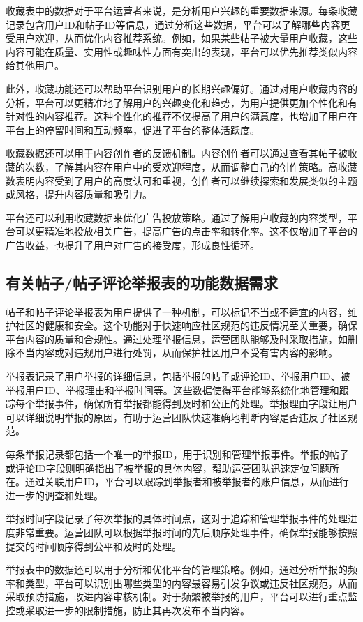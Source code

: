 收藏表中的数据对于平台运营者来说，是分析用户兴趣的重要数据来源。每条收藏记录包含用户ID和帖子ID等信息，通过分析这些数据，平台可以了解哪些内容更受用户欢迎，从而优化内容推荐系统。例如，如果某些帖子被大量用户收藏，这些内容可能在质量、实用性或趣味性方面有突出的表现，平台可以优先推荐类似内容给其他用户。

此外，收藏功能还可以帮助平台识别用户的长期兴趣偏好。通过对用户收藏内容的分析，平台可以更精准地了解用户的兴趣变化和趋势，为用户提供更加个性化和有针对性的内容推荐。这种个性化的推荐不仅提高了用户的满意度，也增加了用户在平台上的停留时间和互动频率，促进了平台的整体活跃度。

收藏数据还可以用于内容创作者的反馈机制。内容创作者可以通过查看其帖子被收藏的次数，了解其内容在用户中的受欢迎程度，从而调整自己的创作策略。高收藏数表明内容受到了用户的高度认可和重视，创作者可以继续探索和发展类似的主题或风格，提升内容质量和吸引力。

平台还可以利用收藏数据来优化广告投放策略。通过了解用户收藏的内容类型，平台可以更精准地投放相关广告，提高广告的点击率和转化率。这不仅增加了平台的广告收益，也提升了用户对广告的接受度，形成良性循环。

\subsection{有关帖子/帖子评论举报表的功能数据需求}

帖子和帖子评论举报表为用户提供了一种机制，可以标记不当或不适宜的内容，维护社区的健康和安全。这个功能对于快速响应社区规范的违反情况至关重要，确保平台内容的质量和合规性。通过处理举报信息，运营团队能够及时采取措施，如删除不当内容或对违规用户进行处罚，从而保护社区用户不受有害内容的影响。

举报表记录了用户举报的详细信息，包括举报的帖子或评论ID、举报用户ID、被举报用户ID、举报理由和举报时间等。这些数据使得平台能够系统化地管理和跟踪每个举报事件，确保所有举报都能得到及时和公正的处理。举报理由字段让用户可以详细说明举报的原因，有助于运营团队快速准确地判断内容是否违反了社区规范。

每条举报记录都包括一个唯一的举报ID，用于识别和管理举报事件。举报的帖子或评论ID字段则明确指出了被举报的具体内容，帮助运营团队迅速定位问题所在。通过关联用户ID，平台可以跟踪到举报者和被举报者的账户信息，从而进行进一步的调查和处理。

举报时间字段记录了每次举报的具体时间点，这对于追踪和管理举报事件的处理进度非常重要。运营团队可以根据举报时间的先后顺序处理事件，确保举报能够按照提交的时间顺序得到公平和及时的处理。

举报表中的数据还可以用于分析和优化平台的管理策略。例如，通过分析举报的频率和类型，平台可以识别出哪些类型的内容最容易引发争议或违反社区规范，从而采取预防措施，改进内容审核机制。对于频繁被举报的用户，平台可以进行重点监控或采取进一步的限制措施，防止其再次发布不当内容。

